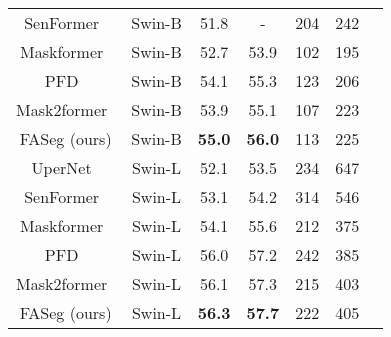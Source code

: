\begin{table}[t!]
{\begin{tabular}{c|c|ccccc}
SenFormer~\cite{bousselham2021efficient} &  Swin-B & 51.8 & - & 204 & 242 \\
Maskformer~\cite{cheng2021per} & Swin-B & 52.7 & 53.9 & 102 & 195 \\
PFD~\cite{qin2022pyramid} & Swin-B & 54.1 & 55.3 & 123 & 206 \\
Mask2former~\cite{cheng2021masked} & Swin-B & 53.9 & 55.1 & 107 & 223 \\
FASeg (ours) & Swin-B & \textbf{55.0} & \textbf{56.0} & 113 & 225 \\
\shline
UperNet~\cite{xiao2018unified} & Swin-L & 52.1 & 53.5& 234 & 647  \\
SenFormer~\cite{bousselham2021efficient} &  Swin-L & 53.1 & 54.2 & 314 & 546 \\
Maskformer~\cite{cheng2021per} & Swin-L & 54.1 & 55.6 & 212 & 375 \\
PFD~\cite{qin2022pyramid} & Swin-L & 56.0 & 57.2 & 242 & 385 \\
Mask2former~\cite{cheng2021masked} & Swin-L & 56.1 & 57.3 & 215 & 403 \\
FASeg (ours) & Swin-L & \textbf{56.3} & \textbf{57.7} & 222 & 405 \\
\end{tabular}}
\vspace{-0.5em}
\label{tab:ADE_new}
\end{table}


\begin{table}[t!]
\centering
\caption{Performance comparisons with the state-of-the-art semantic segmentation methods on Cityscapes \texttt{val}~\cite{cordts2016cityscapes}. We report single-scale (s.s.) inference results.  \#P and \#F indicate the number of parameters (M) and FLOPs (G). 
}
\vspace{-0.5em}
\label{tab:cityscapes}
\vspace{-1em}
\end{table}

